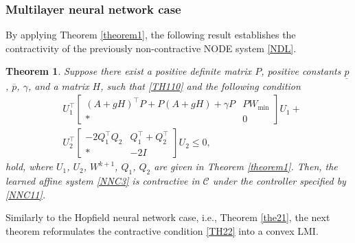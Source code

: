 \documentclass[journal,twoside,web]{ieeecolor}
\newtheorem{theorem}            {Theorem}[section]
\begin{document}
\subsubsection{‌Multilayer neural network case}
By applying Theorem \ref{theorem1}, the following result establishes the contractivity of the previously non-contractive NODE system \eqref{NDL}.
\begin{theorem}\label{theorem2}
Suppose there exist a positive definite matrix $P$, positive constants $\underline{p}$, $\overline{p}$, $\gamma$, and a matrix $H$, such that \eqref{TH110} and the following condition 
\begin{equation}\label{TH22}
\begin{aligned}
&U_1^\top
\begin{bmatrix}
     (A+gH)^\top P+P(A+gH)+\gamma P &PW_{\min}\\
   \ast & 0
\end{bmatrix}U_1+\\&U_2^\top\begin{bmatrix}
 -2Q_1^\top Q_2&Q_1^\top+Q_2^\top
 \\
\ast&-2I
\end{bmatrix}U_2\leq 0,
\end{aligned}
\end{equation}
hold, where $U_1$, $U_2$, $W^{k+1}$, $Q_1$, $Q_2$ are given in Theorem \ref{theorem1}. Then, the learned affine system \eqref{NNC3} is contractive in $\mathcal{C}$ under the controller specified by \eqref{NNC11}.
\end{theorem}

Similarly to the Hopfield neural network case, i.e., Theorem \ref{the21}, the next theorem reformulates the contractive condition \eqref{TH22} into a convex LMI.
\end{document}
